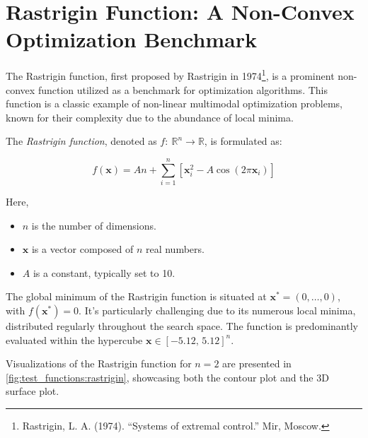 \section{Rastrigin Function: A Non-Convex Optimization Benchmark}
\label{sec:test_functions:rastrigin}

  The Rastrigin function, first proposed by Rastrigin in 1974\footnote{
    Rastrigin, L. A. (1974). \enquote{Systems of extremal control.} Mir, Moscow.
  }, is a prominent non-convex function utilized as a benchmark for optimization
  algorithms.
  This function is a classic example of non-linear multimodal optimization
  problems, known for their complexity due to the abundance of local minima.

  \begin{definition}
  \label{def:test_functions:rastrigin}
    The \emph{Rastrigin function}, denoted as \(f:\:\mathbb{R}^n \rightarrow 
    \mathbb{R}\), is formulated as:

    \begin{equation}
    \label{eq:test_functions:rastrigin}
      f(\mathbf{x}) = An + \sum_{i=1}^{n} \left[
        \mathbf{x}_i^2 - A\cos(2\pi \mathbf{x}_i)
      \right]
    \end{equation}
      
    Here, 
    \begin{itemize}
      \item \(n\) is the number of dimensions.
      \item \(\mathbf{x}\) is a vector composed of \(n\) real numbers.
      \item \(A\) is a constant, typically set to 10.
    \end{itemize}

  \end{definition}

  The global minimum of the Rastrigin function is situated at \(\mathbf{x}^* =
  (0, \ldots, 0)\), with \(f(\mathbf{x}^*) = 0\).
  It's particularly challenging due to its numerous local minima, distributed
  regularly throughout the search space. The function is predominantly evaluated
  within the hypercube \(\mathbf{x} \in [-5.12,\, 5.12]^n\).

  Visualizations of the Rastrigin function for \(n = 2\) are presented in
  \vref{fig:test_functions:rastrigin}, showcasing both the contour plot and the
  3D surface plot.

